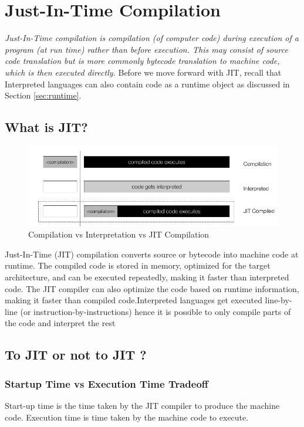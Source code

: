 \documentclass[11pt,paper=a4,answers]{exam}
\begin{document}
\section{Just-In-Time Compilation}
\textit{Just-In-Time compilation is compilation (of computer code) during execution of a program (at run time) rather than before execution. This may consist of source code translation but is more commonly bytecode translation to machine code, which is then executed directly.} Before we move forward with JIT, recall that Interpreted languages can also contain code as a runtime object as discussed in Section \ref{sec:runtime}.

\subsection{What is JIT?}

\begin{figure}[h]
    \centering
    \includegraphics[scale=0.44]{Extras/JIT.png}
    \caption{Compilation vs Interpretation vs JIT Compilation}
    \label{fig:your_label}
\end{figure}
Just-In-Time (JIT) compilation converts source or bytecode into machine code at runtime. The compiled code is stored in memory, optimized for the target architecture, and can be executed repeatedly, making it faster than interpreted code. The JIT compiler can also optimize the code based on runtime information, making it faster than compiled code.Interpreted languages get executed line-by-line (or instruction-by-instructions) hence it is possible to only compile parts of the code and interpret the rest
\subsection{To JIT or not to JIT ?}
\subsubsection{Startup Time vs Execution Time Tradeoff}
Start-up time is the time taken by the JIT compiler to produce the machine code.
Execution time is time taken by the machine code to execute.
\end{document}
